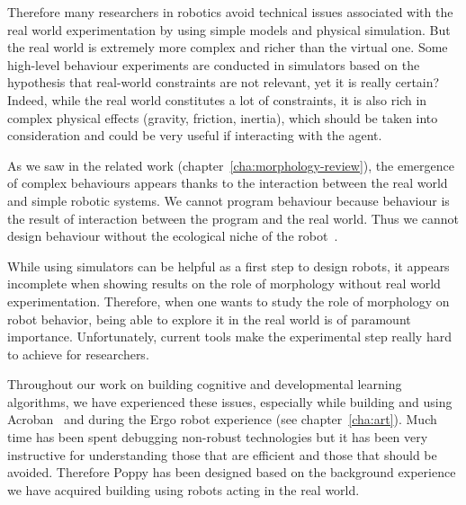 Therefore many researchers in robotics avoid technical issues associated with the real world experimentation by using simple models and physical simulation. But the real world is extremely more complex and richer than the virtual one.
Some high-level behaviour experiments are conducted in simulators based on the hypothesis that real-world constraints are not relevant, yet it is really certain?
Indeed, while the real world constitutes a lot of constraints, it is also rich in complex physical effects (gravity, friction, inertia), which should be taken into consideration and could be very useful if interacting with the agent.

As we saw in the related work (chapter~\ref{cha:morphology-review}), the emergence of complex behaviours appears thanks to the interaction between the real world and simple robotic systems. We cannot program behaviour because behaviour is the result of interaction  between the program and the real world. Thus we cannot design behaviour without the ecological niche of the robot~\cite{Steels1991emergence}.

While using simulators can be helpful as a first step to design robots, it appears incomplete when showing results on the role of morphology without real world experimentation.
Therefore, when one wants to study the role of morphology on robot behavior, being able to explore it in the real world is of paramount importance. Unfortunately, current tools make the experimental step really hard to achieve for researchers.

Throughout our work on building cognitive and developmental learning algorithms, we have experienced these issues, especially while building and using Acroban~\cite{Ly2010} and during the Ergo robot experience (see chapter~\ref{cha:art}). Much time has been spent debugging non-robust technologies but it has been very instructive for understanding those that are efficient and those that should be avoided.
Therefore Poppy has been designed based on the background experience we have acquired building using robots acting in the real world.

